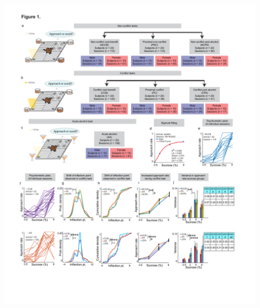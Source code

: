 \documentclass{article}
\begin{document}
\begin{figure} %
  \centering
  \includegraphics[width=\textwidth, trim=100 200 100 200]{Figs/Alcohol_main_1.pdf}
\end{figure}

\clearpage

\captionsetup{type=figure}  %
\caption{\textbf{Overview and general analysis of behavioral tasks}. (a) Non-conflict, (b) conflict, and (c) acute alcohol cost-benefit tasks utilizing the RECORD setup where one of four sucrose concentrations are dispensed into a bowl surrounded by LED lights. (d) Example of psychometric function from a singular non-conflict cost benefit (NCCB) session, fitted with a 4-parameter logistic model $(f(x) = d + (a-d)/ (1 + (x/c)^b))$. Individual (n=20) psychometric functions demonstrating approach rate in non-conflict (e), conflict (f, top), and acute alcohol cost benefit tasks (f, bottom). (g, top) No significant difference in probability density of inflection points between acute alcohol (AA) compared to NCCB (p = 0.08) or NCPA (p = 0.75). (g, bottom) There are significant differences between AA, cost benefit conflict (CCB) tasks (KS test, p $<$ 0.0001), and no significant differences between AA and CPA (p = 0.17). (h) Inflection point distribution represented as a cumulative density function. (i, top) When comparing NCCB to AA (p = 0.001) and NCPA to NCCB (p = 0.05) approach rates are significantly different. (i, bottom) Similarly, comparing CCB to AA (p $<$ 0.0001) and CCB to CPA (p = 0.04) approach rates are also significantly different. (j) Variance in approach rate, with error bars depicting upper and lower confidence intervals with 95\% significance, show significance between NCCB and AA tasks (F-test, p = 0.0096), and CCB and AA tasks (F-test, p $<$ 0.0001).}
\label{fig:alcohol_main_1}
\end{document}
